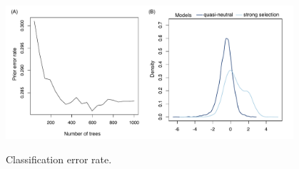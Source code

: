 \documentclass[12pt]{article}
\begin{document}
\begin{figure}[ht]
  \centering
  \includegraphics[width=0.95\textwidth]{Figures/lda_plot_classErr_comb_placerita.pdf}
  \label{fig:figS9}
  \caption{Classification error rate.}
\end{figure}


\newpage


\end{document}
